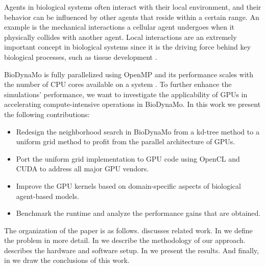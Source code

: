 \documentclass[conference]{IEEEtran}
\begin{document}
Agents in biological systems often interact with their local environment, and their behavior can be influenced by other agents that reside within a certain range.
An example is the mechanical interactions a cellular agent undergoes when it physically collides with another agent.
Local interactions are an extremely important concept in biological systems since it is the driving force behind key biological processes, such as tissue development \cite{van2015simulating}.
\par BioDynaMo is fully parallelized using OpenMP and its performance scales with the number of CPU cores available on a system \cite{breitwieser2021biodynamo}.
To further enhance the simulations' performance, we want to investigate the applicability of GPUs in accelerating compute-intensive operations in BioDynaMo.
In this work we present the following contributions:
\let\labelitemi\labelitemii
\begin{itemize}
    \item Redesign the neighborhood search in BioDynaMo from a kd-tree method to a uniform grid method to profit from the parallel architecture of GPUs.
    \item Port the uniform grid implementation to GPU code using OpenCL and CUDA to address all major GPU vendors.
    \item Improve the GPU kernels based on domain-specific aspects of biological agent-based models.
    \item Benchmark the runtime and analyze the performance gains that are obtained.
\end{itemize}

\par The organization of the paper is as follows.
 discusses related work.
In  we define the problem in more detail.
In  we describe the methodology of our approach.
 describes the hardware and software setup.
In  we present the results.
And finally, in  we draw the conclusions of this work.
\end{document}
